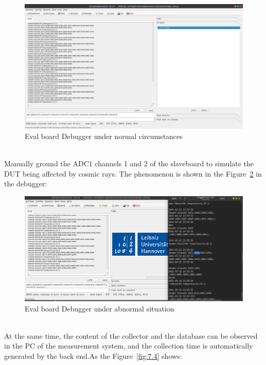 \begin{figure}[!ht]
	\centering
	\includegraphics[width=16cm]{grafiken/debugger.pdf}
	\caption{Eval board Debugger under normal circumstances}
	\label{fig:7.2}
\end{figure}
\FloatBarrier
\\
Manually ground the ADC1 channels 1 and 2 of the slaveboard to simulate the DUT being affected by cosmic rays. The phenomenon is shown in the Figure~\ref{fig:7.3} in the debugger:
\begin{figure}[!ht]
	\centering
	\includegraphics[width=16cm]{grafiken/break.eps}
	\caption{Eval board Debugger under abnormal situation}
	\label{fig:7.3}
\end{figure}
\FloatBarrier
\\
At the same time, the content of the collector and the database can be observed in the PC of the measurement system, and the collection time is automatically generated by the back end.As the Figure~\ref{fig:7.4} shows:
